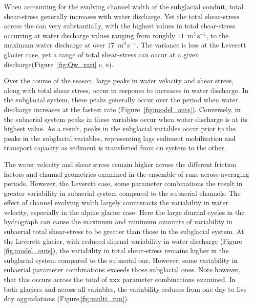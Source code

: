 \documentclass[draft]{agujournal2019}
\newcommand{\unit}[1]{$\mathrm{#1}$}
\begin{document}
When accounting for the evolving channel width of the subglacial conduit, total shear-stress generally increases with water discharge.
Yet the total shear-stress across the can very substantially, with the highest values in total shear-stress occurring at water discharge values ranging from roughly $11$ \,\unit{m}$^3$\,\unit{s}$^{-1}$, to the maximum water discharge at over $17$ \,\unit{m}$^3$\,\unit{s}$^{-1}$.
The variance is less at the Leverett glacier case, yet a range of total shear-stress can occur at a given discharge(Figure~\ref{fig:Qw_vari} c, e).

Over the course of the season, large peaks in water velocity and shear stress, along with total shear stress, occur in response to increases in water discharge.
In the subglacial system, these peaks generally occur over the period when water discharge increases at the fastest rate (Figure~\ref{fig:model_outs}).
Conversely, in the subaerial system peaks in these variables occur when water discharge is at its highest value.
As a result, peaks in the subglacial variables occur prior to the peaks in the subglacial variables, representing lags sediment mobilization and  transport capacity as sediment is transferred from on system to the other.

The water velocity and shear stress remain higher across the different friction factors and channel geometries examined in the ensemble of runs across averaging periods.
However, the Leverett case, some parameter combinations the result in greater variability in subaerial system compared to the subaerial channels.
The effect of channel evolving width largely counteracts the variability in water velocity, especially in the alpine glacier case.
Here the large diurnal cycles in the hydrograph can cause the maximum and minimum amounts of variability in subaerial total shear-stress to be greater than those in the subglacial system.
At the Leverett glacier, with reduced diurnal variability in water discharge (Figure\,\ref{fig:model_outs}), the variability in total shear-stress remains higher in the subglacial system compared to the subaerial one.
However, some variability in subaerial parameter combinations exceeds those subglacial ones.
Note however, that this occurs across the total of xxx parameter combinations examined.
In both glaciers and across all variables, the variability reduces from one day to five day aggradations (Figure\,\ref{fig:multi_run}).
\end{document}

